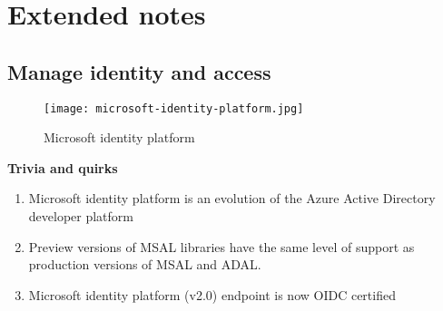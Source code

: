 \section{Extended notes}
\subsection{Manage identity and access}

\begin{figure}[!h]
\texttt{[image: microsoft-identity-platform.jpg]}
\caption{Microsoft identity platform}
\end{figure}

\textbf{Trivia and quirks} 
\begin{enumerate}
\item Microsoft identity platform is an evolution of the Azure Active Directory developer platform
\item Preview versions of MSAL libraries have the same level of support as production versions of MSAL and ADAL.
\item Microsoft identity platform (v2.0) endpoint is now OIDC certified
\end{enumerate}

